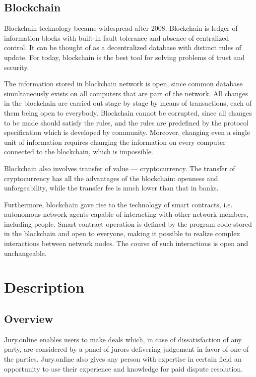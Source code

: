\documentclass[12pt]{article}
\begin{document}
\subsection{Blockchain} Blockchain technology became widespread after 2008\cite{nakamoto}. Blockchain is ledger of information blocks with built-in fault
tolerance and absence of centralized control. It can be thought of as a decentralized database with distinct rules of update. For today,
blockchain is the best tool for solving problems of trust and security.

The information stored in blockchain network is open, since common database simultaneously exists on all computers that are part of the
network. All changes in the blockchain are carried out stage by stage by means of transactions, each of them being open to everybody.
Blockchain cannot be corrupted, since all changes to be made should satisfy the rules, and the rules are predefined by the protocol
specification which is developed by community. Moreover, changing even a single unit of information requires changing the information on
every computer connected to the blockchain, which is impossible. 

Blockchain also involves transfer of value --- cryptocurrency. The transfer of cryptocurrency has all the advantages of the blockchain:
openness and unforgeability, while the transfer fee is much lower than that in banks.

Furthermore, blockchain gave rise to the technology of smart contracts, i.e. autonomous network agents capable of interacting with other
network members, including people. Smart contract operation is defined by the program code stored in the blockchain and open to everyone,
making it possible to realize complex interactions between network nodes. The course of such interactions is open and unchangeable.

\section{Description}
\subsection{Overview} Jury.online enables users to make deals which, in case of dissatisfaction of any party, are
considered by a panel of jurors delivering judgement in favor of one of the parties. Jury.online also gives any person with expertise in
certain field an opportunity to use their experience and knowledge for paid dispute resolution.
\end{document}
